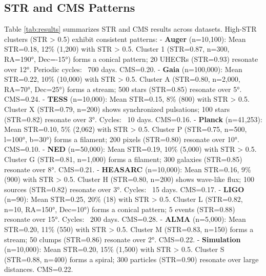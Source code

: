 \documentclass[12pt, twocolumn]{article}
\begin{document}
\subsection{STR and CMS Patterns}
Table \ref{tab:results} summarizes STR and CMS results across datasets. High-STR clusters (STR > 0.5) exhibit consistent patterns:
- \textbf{Auger} (n=10,100): Mean STR=0.18, 12\% (1,200) with STR > 0.5. Cluster 1 (STR=0.87, n=300, RA=190°, Dec=-15°) forms a conical pattern; 20 UHECRs (STR=0.93) resonate over 12°. Periodic cycles: ~700 days. CMS=0.20.
- \textbf{Gaia} (n=100,000): Mean STR=0.22, 10\% (10,000) with STR > 0.5. Cluster A (STR=0.80, n=2,000, RA=70°, Dec=25°) forms a stream; 500 stars (STR=0.85) resonate over 5°. CMS=0.24.
- \textbf{TESS} (n=10,000): Mean STR=0.15, 8\% (800) with STR > 0.5. Cluster X (STR=0.79, n=200) shows synchronized pulsations; 100 stars (STR=0.82) resonate over 3°. Cycles: ~10 days. CMS=0.16.
- \textbf{Planck} (n=41,253): Mean STR=0.10, 5\% (2,062) with STR > 0.5. Cluster P (STR=0.75, n=500, l=100°, b=30°) forms a filament; 200 pixels (STR=0.80) resonate over 10°. CMS=0.10.
- \textbf{NED} (n=50,000): Mean STR=0.19, 10\% (5,000) with STR > 0.5. Cluster G (STR=0.81, n=1,000) forms a filament; 300 galaxies (STR=0.85) resonate over 8°. CMS=0.21.
- \textbf{HEASARC} (n=10,000): Mean STR=0.16, 9\% (900) with STR > 0.5. Cluster H (STR=0.80, n=200) shows wave-like flux; 100 sources (STR=0.82) resonate over 3°. Cycles: ~15 days. CMS=0.17.
- \textbf{LIGO} (n=90): Mean STR=0.25, 20\% (18) with STR > 0.5. Cluster L (STR=0.82, n=10, RA=150°, Dec=10°) forms a conical pattern; 5 events (STR=0.88) resonate over 15°. Cycles: ~200 days. CMS=0.28.
- \textbf{ALMA} (n=5,000): Mean STR=0.20, 11\% (550) with STR > 0.5. Cluster M (STR=0.83, n=150) forms a stream; 50 clumps (STR=0.86) resonate over 2°. CMS=0.22.
- \textbf{Simulation} (n=10,000): Mean STR=0.20, 15\% (1,500) with STR > 0.5. Cluster S (STR=0.88, n=400) forms a spiral; 300 particles (STR=0.90) resonate over large distances. CMS=0.22.
\end{document}
